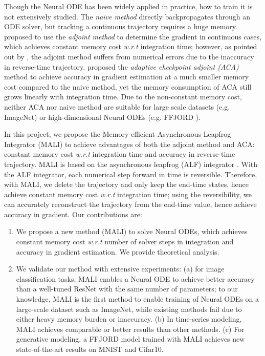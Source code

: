\documentclass{article} \usepackage{iclr2021_conference,times}
\begin{document}
Though the Neural ODE has been widely applied in practice, how to train it is not extensively studied. The \textit{naive method} directly backpropagates through an ODE solver, but tracking a continuous trajectory requires a huge memory. \citet{chen2018neural} proposed to use the \textit{adjoint method} to determine the gradient in continuous cases, which achieves constant memory cost \textit{w.r.t} integration time; however, as pointed out by \citet{zhuang2020adaptive}, the adjoint method suffers from numerical errors due to the inaccuracy in reverse-time trajectory. \citet{zhuang2020adaptive} proposed the \textit{adaptive checkpoint adjoint (ACA)} method to achieve accuracy in gradient estimation at a much smaller memory cost compared to the naive method, yet the memory consumption of ACA still grows linearly with integration time. Due to the non-constant memory cost, neither ACA nor naive method are suitable for large scale datasets (e.g. ImageNet) or high-dimensional Neural ODEs (e.g. FFJORD \citep{grathwohl2018ffjord}).

In this project, we propose the Memory-efficient Asynchronous Leapfrog Integrator (MALI) to achieve advantages of both the adjoint method and ACA: constant memory cost \textit{w.r.t} integration time and accuracy in reverse-time trajectory. MALI is based on the asynchronous leapfrog (ALF) integrator \citep{mutze2013asynchronous}. With the ALF integrator, each numerical step forward in time is reversible. Therefore, with MALI, we delete the trajectory and only keep the end-time states, hence achieve constant memory cost \textit{w.r.t} integration time; using the reversibility, we can accurately reconstruct the trajectory from the end-time value, hence achieve accuracy in gradient. Our contributions are:
\begin{enumerate}[leftmargin=*]
\item We propose a new method (MALI) to solve Neural ODEs, which achieves constant memory cost \textit{w.r.t} number of solver steps in integration and accuracy in gradient estimation. We provide theoretical analysis.\item We validate our method with extensive experiments: (a) for image classification tasks, MALI enables a Neural ODE to achieve better accuracy than a well-tuned ResNet with the same number of parameters; to our knowledge, MALI is the first method to enable training of Neural ODEs on a large-scale dataset such as ImageNet, while existing methods fail due to either heavy memory burden or inaccuracy. (b) In time-series modeling, MALI achieves comparable or better results than other methods. (c) For generative modeling, a FFJORD model trained with MALI achieves new state-of-the-art results on MNIST and Cifar10.
\end{enumerate}
\end{document}
